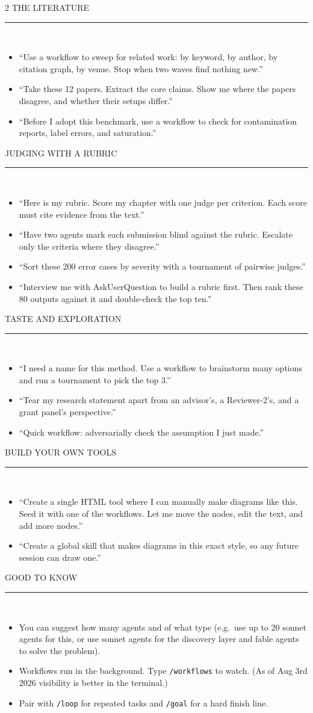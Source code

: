 \documentclass[10pt]{article}
\newcommand{\cat}[1]{%
  \vspace{6pt}%
  {\color{olive}\footnotesize\ttfamily\MakeUppercase{#1}}\\[-9pt]
  {\color{grayline}\rule{\linewidth}{0.8pt}}\\[1pt]}
\newenvironment{prompts}
  {\begin{itemize}[leftmargin=9pt,itemsep=4pt,parsep=0pt,topsep=2pt,label={\color{clay}\small\textbullet}]\small}
  {\end{itemize}}
\newcommand{\p}[1]{\item ``#1''}
\begin{document}
\begin{multicols}{2}
\cat{The literature}
\begin{prompts}
\p{Use a workflow to sweep for related work: by keyword, by author, by citation graph, by venue. Stop when two waves find nothing new.}
\p{Take these 12 papers. Extract the core claims. Show me where the papers disagree, and whether their setups differ.}
\p{Before I adopt this benchmark, use a workflow to check for contamination reports, label errors, and saturation.}
\end{prompts}

\cat{Judging with a rubric}
\begin{prompts}
\p{Here is my rubric. Score my chapter with one judge per criterion. Each score must cite evidence from the text.}
\p{Have two agents mark each submission blind against the rubric. Escalate only the criteria where they disagree.}
\p{Sort these 200 error cases by severity with a tournament of pairwise judges.}
\p{Interview me with AskUserQuestion to build a rubric first. Then rank these 80 outputs against it and double-check the top ten.}
\end{prompts}

\cat{Taste and exploration}
\begin{prompts}
\p{I need a name for this method. Use a workflow to brainstorm many options and run a tournament to pick the top 3.}
\p{Tear my research statement apart from an advisor's, a Reviewer-2's, and a grant panel's perspective.}
\p{Quick workflow: adversarially check the assumption I just made.}
\end{prompts}

\cat{Build your own tools}
\begin{prompts}
\p{Create a single HTML tool where I can manually make diagrams like this. Seed it with one of the workflows. Let me move the nodes, edit the text, and add more nodes.}
\p{Create a global skill that makes diagrams in this exact style, so any future session can draw one.}
\end{prompts}

\cat{Good to know}
\begin{itemize}[leftmargin=9pt,itemsep=3pt,parsep=0pt,topsep=2pt,label={\color{olive}\small\textbullet}]\small
\item You can suggest how many agents and of what type (e.g.\ use up to 20 sonnet agents for this, or use sonnet agents for the discovery layer and fable agents to solve the problem).
\item Workflows run in the background. Type \texttt{/workflows} to watch. (As of Aug 3rd 2026 visibility is better in the terminal.)
\item Pair with \texttt{/loop} for repeated tasks and \texttt{/goal} for a hard finish line.
\end{itemize}

\end{multicols}
\end{document}
